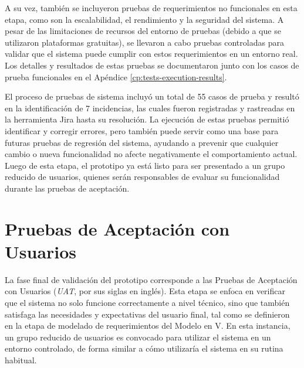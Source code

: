 A su vez, también se incluyeron pruebas de requerimientos no funcionales en esta etapa, como son la escalabilidad, el rendimiento y la seguridad del sistema. A pesar de las limitaciones de recursos del entorno de pruebas (debido a que se utilizaron plataformas gratuitas), se llevaron a cabo pruebas controladas para validar que el sistema puede cumplir con estos requerimientos en un entorno real. Los detalles y resultados de estas pruebas se documentaron junto con los casos de prueba funcionales en el Apéndice \ref{cp:tests-execution-results}.

El proceso de pruebas de sistema incluyó un total de 55 casos de prueba y resultó en la identificación de 7 incidencias, las cuales fueron registradas y rastreadas en la herramienta Jira hasta su resolución. La ejecución de estas pruebas permitió identificar y corregir errores, pero también puede servir como una base para futuras pruebas de regresión del sistema, ayudando a prevenir que cualquier cambio o nueva funcionalidad no afecte negativamente el comportamiento actual. Luego de esta etapa, el prototipo ya está listo para ser presentado a un grupo reducido de usuarios, quienes serán responsables de evaluar su funcionalidad durante las pruebas de aceptación.

\section{Pruebas de Aceptación con Usuarios}
\label{sec:user-acceptance-testing}

La fase final de validación del prototipo corresponde a las Pruebas de Aceptación con Usuarios (\textit{UAT}, por sus siglas en inglés). Esta etapa se enfoca en verificar que el sistema no solo funcione correctamente a nivel técnico, sino que también satisfaga las necesidades y expectativas del usuario final, tal como se definieron en la etapa de modelado de requerimientos del Modelo en V. En esta instancia, un grupo reducido de usuarios es convocado para utilizar el sistema en un entorno controlado, de forma similar a cómo utilizaría el sistema en su rutina habitual. 

